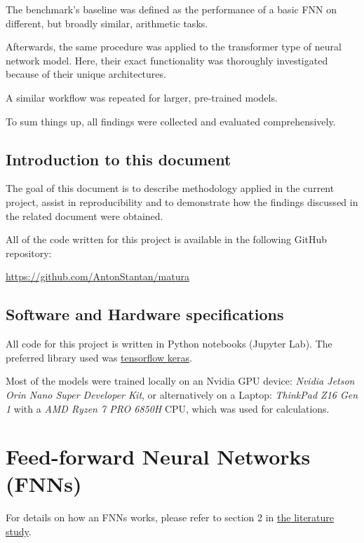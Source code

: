 \documentclass{article}
\begin{document}
The benchmark's baseline was defined as the performance of a basic FNN on different, but broadly similar, arithmetic tasks.

Afterwards, the same procedure was applied to the transformer type of neural network model. Here, their exact functionality was thoroughly investigated because of their unique architectures.

A similar workflow was repeated for larger, pre-trained models.

To sum things up, all findings were collected and evaluated comprehensively.


\subsection{Introduction to this document}
The goal of this document is to describe methodology applied in the current project, assist in reproducibility and to demonstrate how the findings discussed in the related document were obtained.

All of the code written for this project is available in the following GitHub repository:

\url{https://github.com/AntonStantan/matura}

\subsection{Software and Hardware specifications}

All code for this project is written in Python notebooks (Jupyter Lab). The preferred library used was \href{https://www.tensorflow.org/guide/keras}{tensorflow keras}.

Most of the models were trained locally on an Nvidia GPU device: \textit{Nvidia Jetson Orin Nano Super Developer Kit}, or alternatively on a Laptop: \textit{ThinkPad Z16 Gen 1} with a \textit{AMD Ryzen 7 PRO 6850H} CPU, which was used for calculations.





\newpage
\tableofcontents
\newpage

\section{Feed-forward Neural Networks (FNNs)}
For details on how an FNNs works, please refer to section 2 in \href{https://github.com/AntonStantan/matura/blob/main/zwischenProdukt/LiteraturstudieAnton.pdf}{the literature study}.
\end{document}
